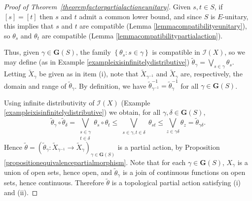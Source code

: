 \begin{proof}[Proof of Theorem~\ref{theoremfactorpartialactioneunitary}]
Given $s,t\in S$, if $[s]=[t]$ then $s$ and $t$ admit a common lower bound, and since $S$ is $E$-unitary, this implies that $s$ and $t$ are compatible (Lemma \ref{lemmacompatibilityeunitary}), so $\theta_s$ and $\theta_t$ are compatible (Lemma \ref{lemmacompatibilitypartialaction}).

Thus, given $\gamma\in\mathbf{G}(S)$, the family $\left\{\theta_s:s\in\gamma\right\}$ is compatible in $\mathcal{I}(X)$, so we may define (as in Example \ref{exampleixisinfinitelydistributive}) $\widetilde{\theta}_\gamma=\bigvee_{s\in\gamma}\theta_s$. Letting $\widetilde{X}_\gamma$ be given as in item (i), note that $\widetilde{X}_{\gamma^{-1}}$ and $\widetilde{X}_\gamma$ are, respectively, the domain and range of $\widetilde{\theta}_\gamma$. By definition, we have $\widetilde{\theta}_{\gamma^{-1}}^{-1}=\widetilde{\theta}_\gamma^{-1}$ for all $\gamma\in\mathbf{G}(S)$.

Using infinite distributivity of $\mathcal{I}(X)$ (Example \ref{exampleixisinfinitelydistributive}) we obtain, for all $\gamma,\delta\in \mathbf{G}(S)$,
\[\widetilde{\theta}_\gamma\circ\widetilde{\theta}_{\delta}=\bigvee_{\substack{s\in\gamma\\t\in\delta}}\theta_s\circ\theta_t\leq\bigvee_{\substack{s\in\gamma,t\in\delta}}\theta_{st}\leq\bigvee_{z\in\gamma\delta}\theta_z=\widetilde{\theta}_{\gamma\delta}.\]
Hence $\widetilde{\theta}=\left(\widetilde{\theta}_{\gamma}:\widetilde{X}_{\gamma^{-1}}\to\widetilde{X}_\gamma\right)_{\gamma\in\mathbf{G}(S)}$ is a partial action, by Proposition \ref{propositionequivalencepartialmorphism}. Note that for each $\gamma\in\mathbf{G}(S)$, $X_\gamma$ is a union of open sets, hence open, and $\widetilde{\theta}_{\gamma}$ is a join of continuous functions on open sets, hence continuous. Therefore $\widetilde{\theta}$ is a topological partial action satisfying (i) and (ii).\qedhere



\end{proof}
